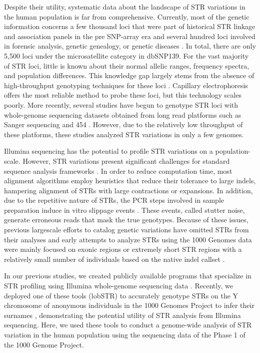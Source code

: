 Despite their utility, systematic data about the landscape of STR variations in the human population is far from comprehensive. Currently, most of the genetic information concerns a few thousand loci that were part of historical STR linkage and association panels in the pre SNP-array era \cite{BromanMurraySheffieldEtAl1998,TamiyaShinyaImanishiEtAl2005} and several hundred loci involved in forensic analysis, genetic genealogy, or genetic diseases \cite{RuitbergReederButler2001,PearsonNicholEdamuraCleary2005}. In total, there are only 5,500 loci under the microsatellite category in dbSNP139. For the vast majority of STR loci, little is known about their normal allelic ranges, frequency spectra, and population differences. This knowledge gap largely stems from the absence of high-throughput genotyping techniques for these loci \cite{JorgensonWitte2007}. Capillary electrophoresis offers the most reliable method to probe these loci, but this technology scales poorly. More recently, several studies have begun to genotype STR loci with whole-genome sequencing datasets obtained from long read platforms such as Sanger sequencing \cite{PayseurJingHaasl2011} and 454 \cite{MollaDelcherSunyaevEtAl2009}. However, due to the relatively low throughput of these platforms, these studies analyzed STR variations in only a few genomes.

Illumina sequencing has the potential to profile STR variations on a population-scale. However, STR variations present significant challenges for standard sequence analysis frameworks \cite{TreangenSalzberg2012}. In order to reduce computation time, most alignment algorithms employ heuristics that reduce their tolerance to large indels, hampering alignment of STRs with large contractions or expansions. In addition, due to the repetitive nature of STRs, the PCR steps involved in sample preparation induce in vitro slippage events \cite{HaugeLitt1993}. These events, called stutter noise, generate erroneous reads that mask the true genotypes. Because of these issues, previous largescale efforts to catalog genetic variations have omitted STRs from their analyses \cite{AbecasisAltshulerAutonEtAl2010} and early attempts to analyze STRs using the 1000 Genomes data were mainly focused on exonic regions \cite{McIverFondonSkinnerEtAl2011} or extremely short STR regions with a relatively small number of individuals based on the native indel callset \cite{AnandaWalshJacobEtAl2012}.

In our previous studies, we created publicly available programs that specialize in STR profiling using Illumina whole-genome sequencing data \cite{GymrekGolanRossetEtAl2012,HighnamFranckMartinEtAl2013}. Recently, we deployed one of these tools (lobSTR) to accurately genotype STRs on the Y chromosome of anonymous individuals in the 1000 Genomes Project to infer their surnames \cite{GymrekMcGuireGolanEtAl2013}, demonstrating the potential utility of STR analysis from Illumina sequencing. Here, we used these tools to conduct a genome-wide analysis of STR variation in the human population using the sequencing data of the Phase 1 of the 1000 Genome Project.

